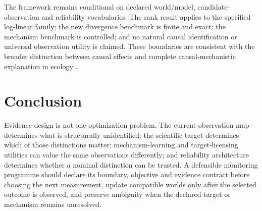 \documentclass[11pt]{article}
\begin{document}
The framework remains conditional on declared world/model, candidate-observation and reliability vocabularies. The rank result applies to the specified log-linear family; the new divergence benchmark is finite and exact; the mechanism benchmark is controlled; and no natural causal identification or universal observation utility is claimed. These boundaries are consistent with the broader distinction between causal effects and complete causal-mechanistic explanation in ecology \cite{GraceEtAl2025,CorreiaEtAl2025,SiegelDee2025}.

\section{Conclusion}
Evidence design is not one optimization problem. The current observation map determines what is structurally unidentified; the scientific target determines which of those distinctions matter; mechanism-learning and target-licensing utilities can value the same observations differently; and reliability architecture determines whether a nominal distinction can be trusted. A defensible monitoring programme should declare its boundary, objective and evidence contract before choosing the next measurement, update compatible worlds only after the selected outcome is observed, and preserve ambiguity when the declared target or mechanism remains unresolved.


\end{document}
